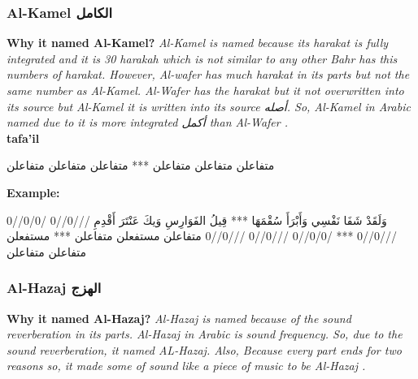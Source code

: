 
\subsubsection{Al-Kamel \textarabic{الكامل}}
\textbf{Why it named Al-Kamel?}
\textit{Al-Kamel is named because its harakat is fully integrated and it is 30 harakah which is not similar to any other Bahr has this numbers of harakat. However, Al-wafer has much harakat in its parts but not the same number as Al-Kamel. Al-Wafer has the harakat but it not overwritten into its source but Al-Kamel it is written into its source \textarabic{أصله}. So, Al-Kamel in Arabic named due to it is more integrated  \textarabic{أكمل} than Al-Wafer \cite{Alkafi1994}.
}\\

\textbf{tafa'il}

\begin{Arabic}
	\begin{traditionalpoem*}
متفاعلن متفاعلن متفاعلن *** متفاعلن متفاعلن متفاعلن


	\end{traditionalpoem*}
      \end{Arabic}


\textbf{Example:}

\begin{Arabic}
	\begin{traditionalpoem*}
وَلَقَدْ شَفَا نَفْسِي وَأَبْرَأَ سُقْمَهَا *** قِيلُ الفَوَارِسِ وَيكَ عَنْتَرَ أَقْدِمِ
///0//0 /0/0//0 ///0//0 ***  /0/0//0 ///0//0 ///0//0
متفاعلن مستفعلن متفاعلن *** مستفعلن متفاعلن متفاعلن

	\end{traditionalpoem*}
      \end{Arabic}


\subsubsection{Al-Hazaj \textarabic{الهزج}}
\textbf{Why it named Al-Hazaj?}
\textit{Al-Hazaj is named because of the sound reverberation in its parts. Al-Hazaj in Arabic is sound frequency. So, due to the sound reverberation, it named AL-Hazaj. Also, Because every part ends for two reasons so, it made some of sound like a piece of music to be Al-Hazaj \cite{Alkafi1994}.  }\\

